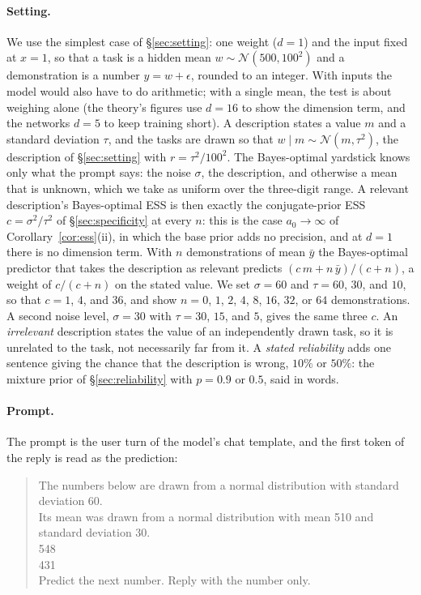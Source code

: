 \documentclass{article}
\begin{document}
\paragraph{Setting.} We use the simplest case of \S\ref{sec:setting}: one weight ($d = 1$) and the input fixed at $x = 1$, so that a task is a hidden mean $w \sim \mathcal{N}(500, 100^2)$ and a demonstration is a number $y = w + \epsilon$, rounded to an integer. With inputs the model would also have to do arithmetic; with a single mean, the test is about weighing alone (the theory's figures use $d = 16$ to show the dimension term, and the networks $d = 5$ to keep training short). A description states a value $m$ and a standard deviation $\tau$, and the tasks are drawn so that $w \mid m \sim \mathcal{N}(m, \tau^2)$, the description of \S\ref{sec:setting} with $r = \tau^2 / 100^2$. The Bayes-optimal yardstick knows only what the prompt says: the noise $\sigma$, the description, and otherwise a mean that is unknown, which we take as uniform over the three-digit range. A relevant description's Bayes-optimal ESS is then exactly the conjugate-prior ESS $c = \sigma^2 / \tau^2$ of \S\ref{sec:specificity} at every $n$: this is the case $a_0 \to \infty$ of Corollary~\ref{cor:ess}(ii), in which the base prior adds no precision, and at $d = 1$ there is no dimension term. With $n$ demonstrations of mean $\bar y$ the Bayes-optimal predictor that takes the description as relevant predicts $(c\,m + n\,\bar y)/(c + n)$, a weight of $c/(c+n)$ on the stated value. We set $\sigma = 60$ and $\tau = 60$, $30$, and $10$, so that $c = 1$, $4$, and $36$, and show $n = 0$, $1$, $2$, $4$, $8$, $16$, $32$, or $64$ demonstrations. A second noise level, $\sigma = 30$ with $\tau = 30$, $15$, and $5$, gives the same three $c$. An \emph{irrelevant} description states the value of an independently drawn task, so it is unrelated to the task, not necessarily far from it. A \emph{stated reliability} adds one sentence giving the chance that the description is wrong, $10\%$ or $50\%$: the mixture prior of \S\ref{sec:reliability} with $p = 0.9$ or $0.5$, said in words.

\paragraph{Prompt.} The prompt is the user turn of the model's chat template, and the first token of the reply is read as the prediction:

\begin{quote}\small\ttfamily
The numbers below are drawn from a normal distribution with standard deviation 60.\\
Its mean was drawn from a normal distribution with mean 510 and standard deviation 30.\\[3pt]
548\\
431\\[3pt]
Predict the next number. Reply with the number only.
\end{quote}
\end{document}
